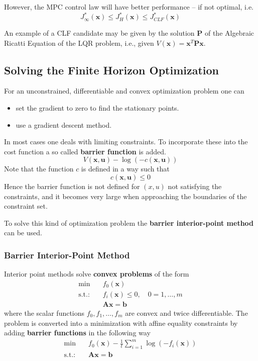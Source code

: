 However, the MPC control law will have better performance -- if not optimal, i.e. %
\begin{equation*}
    J^*_\infty(\mathbf{x}) \leq J^*_H(\mathbf{x}) \leq J^*_{CLF}(\mathbf{x})
\end{equation*}

An example of a CLF candidate may be given by the solution $\mathbf{P}$ of the Algebraic Ricatti Equation of the LQR problem, i.e., given $V(\mathbf{x}) = \mathbf{x}^T \mathbf{Px}$.

\subsection{Solving the Finite Horizon Optimization}

For an unconstrained, differentiable and convex optimization problem one can
\begin{itemize}
    \item set the gradient to zero to find the stationary points.
    \item use a gradient descent method.
\end{itemize}

In most cases one deals with limiting constraints. To incorporate these into the cost function a so called \textbf{barrier function} is added.
\begin{equation*}
    V(\mathbf{x,u}) - \log(-c(\mathbf{x,u}))
\end{equation*}
Note that the function $c$ is defined in a way such that
\begin{equation*}
    c(\mathbf{x,u}) \leq 0
\end{equation*}
Hence the barrier function is not defined for $(x,u)$ not satisfying the constraints, and it becomes very large when approaching the boundaries of the constraint set.

To solve this kind of optimization problem the \textbf{barrier interior-point method} can be used.

\subsubsection{Barrier Interior-Point Method}
Interior point methods solve \textbf{convex problems} of the form
\begin{align*}
    \min \quad         & f_0( \mathbf{x})                                 \\
    \text{s.t.:} \quad & f_i( \mathbf{x}) \leq 0 , \quad 0 = 1, \ldots, m \\
                       &  \mathbf{Ax} = \mathbf{b}
\end{align*}
where the scalar functions $f_0,f_1,\ldots,f_m$ are convex and twice differentiable.
\newpar{}
The problem is converted into a minimization with affine equality constraints by adding \textbf{barrier functions} in the following way
\begin{align*}
    \min \quad        & f_0(\mathbf{x}) - \frac{1}{t}\sum_{i=1}^{m}\log(-f_i(\mathbf{x})) \\
    \text{s.t.:}\quad & \mathbf{Ax}=\mathbf{b}
\end{align*}

